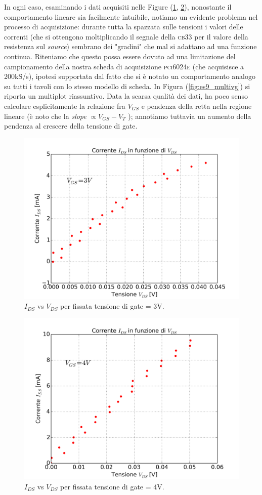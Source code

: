 \documentclass[journal, a4paper]{IEEEtran}
\begin{document}
In ogni caso, esaminando i dati acquisiti nelle Figure (\ref{fig:es9_prova_vg3}, \ref{fig:es9_prova_vg4}), nonostante il comportamento lineare sia facilmente intuibile, notiamo un evidente problema nel processo di acquisizione: durante tutta la spazzata sulle tensioni i valori delle correnti (che si ottengono moltiplicando il segnale della \textsc{cb33} per il valore della resistenza sul \textit{source}) sembrano dei "gradini" che mal si adattano ad una funzione continua. Riteniamo che questo possa essere dovuto ad una limitazione del campionamento della nostra scheda di acquisizione \textsc{pci6024e} (che acquisisce a 200kS/s), ipotesi supportata dal fatto che si è notato un comportamento analogo su tutti i tavoli con lo stesso modello di scheda. In Figura (\ref{fig:es9_multivg}) si riporta un multiplot riassuntivo. Data la scarsa qualità dei dati, ha poco senso calcolare esplicitamente la relazione fra $V_{GS}$ e pendenza della retta nella regione lineare (è noto che la \textit{slope} $ \propto V_{GS} - V_T$ ); annotiamo tuttavia un aumento della pendenza al crescere della tensione di gate.\\

\begin{figure}
\centering
\includegraphics[width=0.8\linewidth]{./es9_prova_vg3}
\caption{$I_{DS}$ vs $V_{DS}$ per fissata tensione di gate = 3V.}
\label{fig:es9_prova_vg3}
\end{figure}

\begin{figure}
\centering
\includegraphics[width=0.8\linewidth]{./es9_prova_vg4}
\caption{$I_{DS}$ vs $V_{DS}$ per fissata tensione di gate = 4V.}
\label{fig:es9_prova_vg4}
\end{figure}
\end{document}
